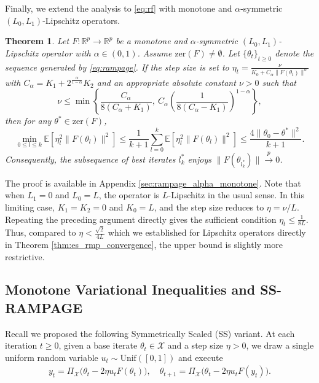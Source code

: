\documentclass[letter,11pt]{article}
\newtheorem{theorem}{Theorem}[]
\begin{document}
Finally, we extend the analysis to \eqref{eq:rf} with monotone and $\alpha$-symmetric $(L_0, L_1)$-Lipschitz operators.
\begin{theorem} \label{thm:rampage_alpha_monotone}
Let $F: \mathbb{R}^p \to \mathbb{R}^p$ be a monotone and $\alpha$-symmetric $(L_0, L_1)$-Lipschitz operator with $\alpha \in (0, 1)$. Assume $\mathrm{zer}(F) \neq \emptyset$. Let $\{\theta_t\}_{t \ge 0}$ denote the sequence generated by \eqref{eq:rampage}. If the step size is set to $\eta_t = \frac{\nu}{K_0 + C_\alpha \|F(\theta_t)\|^\alpha}$ with $C_\alpha = K_1 + 2^{\frac{\alpha}{1-\alpha}} K_2$ and an appropriate absolute constant $\nu > 0$ such that
\begin{equation}
\nu \le \min \left\{ \frac{C_\alpha}{8(C_\alpha + K_1)}, \ C_\alpha \left( \frac{1}{8(C_\alpha - K_1)} \right)^{1-\alpha} \right\},
\end{equation}
then for any $\theta^* \in \mathrm{zer}(F)$,
\begin{equation}
\min_{0 \le l \le k} \mathbb{E}\left[ \eta_l^2 \|F(\theta_l)\|^2 \right] \le \frac{1}{k+1} \sum_{l=0}^k \mathbb{E}\left[ \eta_l^2 \|F(\theta_l)\|^2 \right] \le \frac{4\|\theta_0 - \theta^*\|^2}{k+1}.
\end{equation}
Consequently, the subsequence of best iterates $l^\ast_k$ enjoys $\|F(\theta_{l^\ast_k})\| \xrightarrow{p} 0$.
\end{theorem}
The proof is available in Appendix \ref{sec:rampage_alpha_monotone}. Note that when $L_1 = 0$ and $L_0 = L$, the operator is $L$-Lipschitz in the usual sense. In this limiting case, $K_1 = K_2 = 0$ and $K_0 =L$, and the step size reduces to $\eta = \nu/L$. Repeating the preceding argument directly gives the sufficient condition $\eta_t\le \frac{1}{8L}$. Thus, compared to $\eta < \frac{\sqrt{2}}{4L}$ which we established for Lipschitz operators directly in Theorem \ref{thm:es_rmp_convergence}, the upper bound is slightly more restrictive.
\subsection{Monotone Variational Inequalities and SS-RAMPAGE}
Recall we proposed the following Symmetrically Scaled (SS) variant. At each iteration $t \ge 0$, given a base iterate $\theta_t \in \mathcal{X}$ and a step size $\eta > 0$, we draw a single uniform random variable $u_t \sim \mathrm{Unif}([0, 1])$ and execute
\begin{equation}
\begin{aligned}
y_t = \Pi_{\mathcal{X}} \big( \theta_t - 2\eta u_t F(\theta_t) \big), \quad
\theta_{t+1} = \Pi_{\mathcal{X}} \big( \theta_t - 2\eta u_t F(y_t) \big).
\end{aligned}
\end{equation}
\end{document}
